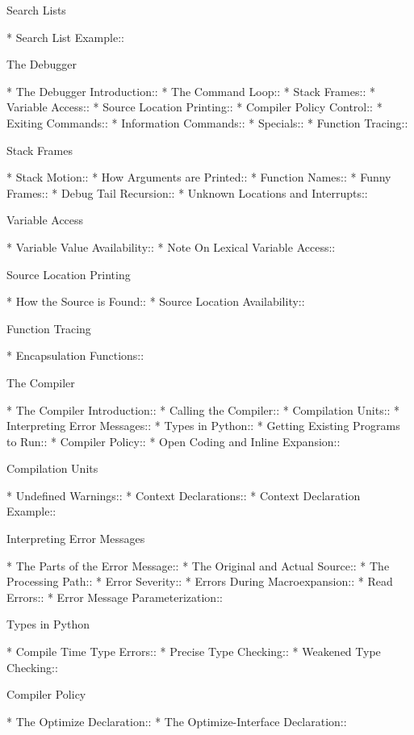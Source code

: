 \begin{menu}
Search Lists

* Search List Example::         

The Debugger

* The Debugger Introduction::   
* The Command Loop::            
* Stack Frames::                
* Variable Access::             
* Source Location Printing::    
* Compiler Policy Control::     
* Exiting Commands::            
* Information Commands::        
* Specials::                    
* Function Tracing::            

Stack Frames

* Stack Motion::                
* How Arguments are Printed::   
* Function Names::              
* Funny Frames::                
* Debug Tail Recursion::        
* Unknown Locations and Interrupts::  

Variable Access

* Variable Value Availability::  
* Note On Lexical Variable Access::  

Source Location Printing

* How the Source is Found::     
* Source Location Availability::  

Function Tracing

* Encapsulation Functions::     

The Compiler

* The Compiler Introduction::   
* Calling the Compiler::        
* Compilation Units::           
* Interpreting Error Messages::  
* Types in Python::             
* Getting Existing Programs to Run::  
* Compiler Policy::             
* Open Coding and Inline Expansion::  

Compilation Units

* Undefined Warnings::          
* Context Declarations::        
* Context Declaration Example::  

Interpreting Error Messages

* The Parts of the Error Message::  
* The Original and Actual Source::  
* The Processing Path::         
* Error Severity::              
* Errors During Macroexpansion::  
* Read Errors::                 
* Error Message Parameterization::  

Types in Python

* Compile Time Type Errors::    
* Precise Type Checking::       
* Weakened Type Checking::      

Compiler Policy

* The Optimize Declaration::    
* The Optimize-Interface Declaration::  


\end{menu}

